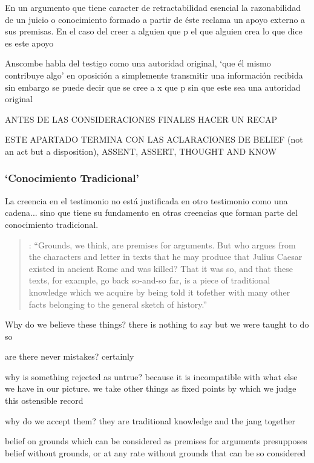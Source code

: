 En un argumento que tiene caracter de retractabilidad esencial la razonabilidad de un juicio o conocimiento formado a partir de éste reclama un apoyo externo a sus premisas. En el caso del creer a alguien que p el que alguien crea lo que dice es este apoyo

Anscombe habla del testigo como una autoridad original, `que él mismo contribuye algo' en oposición a simplemente transmitir una información recibida sin embargo se puede decir que se cree a x que p sin que este sea una autoridad original

ANTES DE LAS CONSIDERACIONES FINALES HACER UN RECAP

ESTE APARTADO TERMINA CON LAS ACLARACIONES DE BELIEF (not an act but a disposition), ASSENT, ASSERT, THOUGHT AND KNOW

\subsubsection{`Conocimiento Tradicional'}

La creencia en el testimonio no está justificada en otro testimonio como una cadena... sino que tiene su fundamento en otras creencias que forman parte del conocimiento tradicional.

\blockquote[{\cite[121--122]{anscombe2015logic:grounds}}: \enquote{Grounds, we think, are premises for arguments. But who argues from the characters and letter in texts that he may produce that Julius Caesar existed in ancient Rome and was killed? That it was so, and that these texts, for example, go back so-and-so far, is a piece of traditional knowledge which we acquire by being told it tofether with many other facts belonging to the general sketch of history.}]{}

Why do we believe these things? there is nothing to say but we were taught to do so

are there never mistakes? certainly

why is something rejected as untrue? because it is incompatible with what else we have in our picture. we take other things as fixed points by which we judge this ostensible record

why do we accept them? they are traditional knowledge and the jang together

belief on grounds which can be considered as premises for arguments presupposes belief without grounds, or at any rate without grounds that can be so considered



